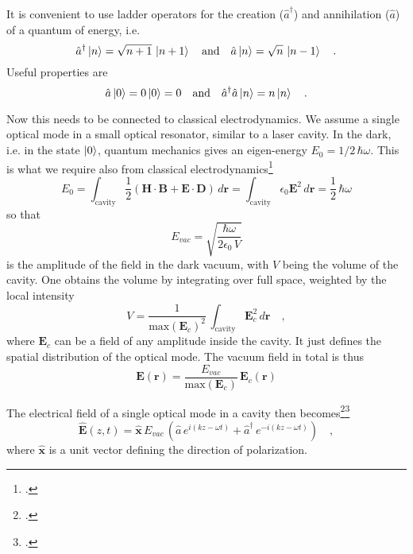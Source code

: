 It is convenient to use ladder operators for the creation ($\hat{a}^\dagger$) and annihilation ($\hat{a}$) of  a quantum of energy, i.e.
\begin{equation}
 \hat{a}^\dagger \ket{n} = \sqrt{n+1}\, \ket{n+1}  \quad \text{and} \quad
  \hat{a} \ket{n} = \sqrt{n}\, \ket{n-1} \quad .
\end{equation}
Useful properties are 
\begin{equation}
 \hat{a} \ket{0} = 0 \ket{0} = 0 \quad \text{and} \quad
  \hat{a}^\dagger  \hat{a} \ket{n} = n \ket{n} \quad .
\end{equation}

Now this needs to be connected to  classical electrodynamics. We assume a single optical mode in a small optical resonator, similar to a laser cavity. In the dark, i.e. in the state $\ket{0}$, quantum mechanics gives an eigen-energy $E_0 = 1/2 \, \hbar \omega$. This is what we require also from classical electrodynamics\footcite[chap. 7.5]{Fox}
\begin{equation}
E_0 = 
 \int_\text{cavity} \frac{1}{2} 
 \left( \boldsymbol{H} \cdot  \boldsymbol{B} + \boldsymbol{E} \cdot  \boldsymbol{D} \right) \, d\boldsymbol{r} = 
  \int_\text{cavity}  \epsilon_0 \boldsymbol{E}^2 \, d\boldsymbol{r} = \frac{1}{2} \, \hbar \omega
\end{equation}
so that
\begin{equation}
E_{vac} = \sqrt{\frac{\hbar \omega}{2 \epsilon_0 \, V}}
\end{equation}
is the amplitude of the field in the dark vacuum, with $V$ being the volume of the cavity. One obtains the volume by integrating over full space, weighted by the local intensity
\begin{equation}
V =  \frac{1}{\text{max}(\boldsymbol{E}_c)^2} \, \int_\text{cavity} \boldsymbol{E}_c^2\, d\boldsymbol{r} \quad ,
\end{equation}
where $\boldsymbol{E}_c$ can be a field of any amplitude inside the cavity. It just defines the spatial distribution of the optical mode. The vacuum field in total is thus
\begin{equation}
\boldsymbol{E}( \boldsymbol{r} ) = 
\frac{  E_{vac}  }{\text{max}(\boldsymbol{E}_c)}
 \, \boldsymbol{E}_c ( \boldsymbol{r} )
\end{equation}


The electrical field of a single optical mode in a cavity then becomes\footcite[chap. 2.1 and 2.4]{GerryKnight2005}\footcite[chap. 6.1]{Rand2016}
\begin{equation}
\hat{\boldsymbol{E}}(z,t) = \boldsymbol{\hat{x}} \, E_{vac} \, \left(\hat{a} \, e^{i (k z - \omega t)} + \hat{a}^\dagger   \, e^{-i (k z - \omega t)} \right) 
\quad ,
\end{equation}
where $\boldsymbol{\hat{x}}$ is a unit vector defining the direction of polarization. 


